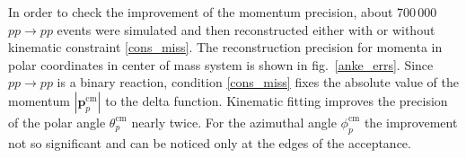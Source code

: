 






In order to check the improvement of the momentum precision, about 700\,000 $pp \to pp$ events were simulated and then reconstructed either with or without kinematic constraint \eqref{cons_miss}.
The reconstruction precision for momenta in polar coordinates in center of mass system is shown in fig.~\ref{anke_errs}.
Since $pp \to pp$ is a binary reaction, condition \eqref{cons_miss} fixes the absolute value of the momentum $|\boldsymbol{p}_p^\mathrm{cm}|$ to the delta function.
Kinematic fitting improves the precision of the polar angle $\theta_p^\mathrm{cm}$ nearly twice.
For the azimuthal angle $\phi_p^\mathrm{cm}$ the improvement not so significant and can be noticed only at the edges of the acceptance.
